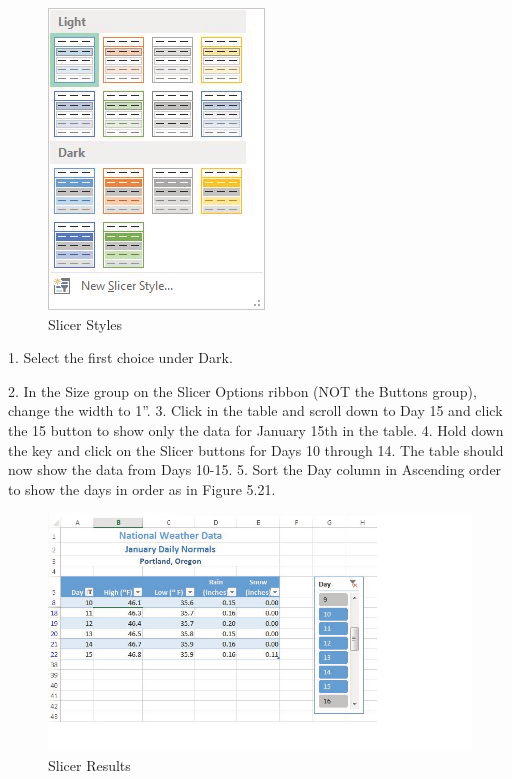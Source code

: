 \begin{figure}[H]
	\centering
	\includegraphics[width=\maxwidth{.95\linewidth}]{gfx/ch05_fig20}
	\caption{Slicer Styles}
	\label{05:fig20}
\end{figure}






1. Select the first choice under Dark.


2. In the Size group on the Slicer Options ribbon (NOT the Buttons group), change the width to 1''.
3. Click in the table and scroll down to Day 15 and click the 15 button to show only the data for
January 15th in the table.
4. Hold down the  key and click on the Slicer buttons for Days 10 through 14. The table should now show the data from Days 10-15.
5. Sort the Day column in Ascending order to show the days in order as in Figure 5.21.


\begin{figure}[H]
	\centering
	\includegraphics[width=\maxwidth{.95\linewidth}]{gfx/ch05_fig21}
	\caption{Slicer Results}
	\label{05:fig21}
\end{figure}






